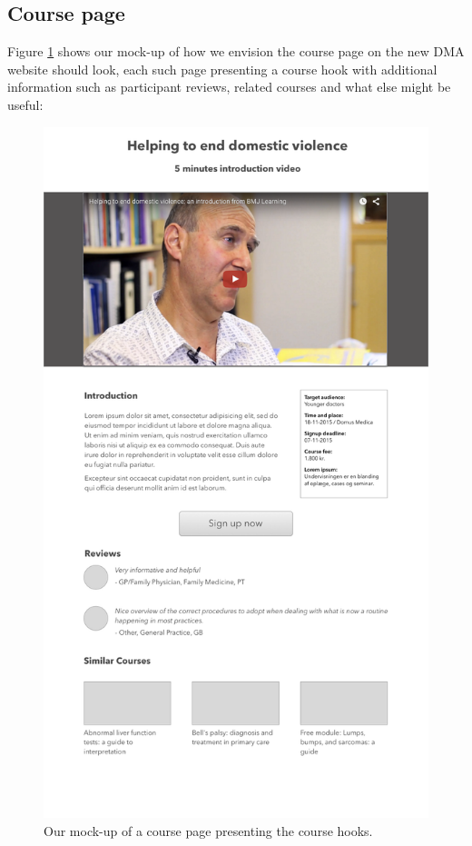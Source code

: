 \begin{appendices}
\section{Course page}
Figure \ref{fig:coursepage} shows our mock-up of how we envision the course page on the new DMA website should look, each such page presenting a course hook with additional information such as participant reviews, related courses and what else might be useful:

\begin{figure}[h!]
 \begin{center}
  \includegraphics[width=1\textwidth]{figures/coursepage.png}
  \caption{Our mock-up of a course page presenting the course hooks.\label{fig:coursepage}}
 \end{center}
\end{figure}

\end{appendices}
